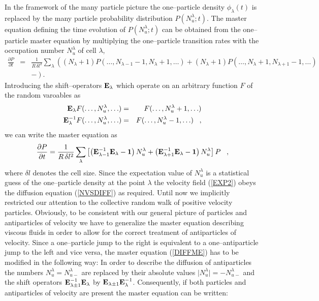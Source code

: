 In the framework of the many particle picture the one--particle
density
$\phi_{\lambda}(t)$ is replaced by the many particle probability
distribution $P(N_u^{\lambda};t)$. The master equation defining the
time evolution of $P(N_u^{\lambda};t)$ can be obtained from the
one--particle master equation by multiplying the one--particle
transition rates
with the occupation number $N_u^{\lambda}$ of cell $\lambda$,
\begin{eqnarray*}
\frac{\partial P}{\partial t} & = &    \frac{1}{R \, \delta l^2}
                                    \sum_{\lambda} \left(
          (N_{\lambda} +1) P(\ldots,N_{\lambda-1}-1, N_{\lambda}+1, \ldots) 
        + (N_{\lambda} +1) P(\ldots, N_{\lambda}+1, N_{\lambda+1} -1, \ldots) 
                                      \right. \\
                            && - \left. \right).
\end{eqnarray*}
Introducing the shift--operators ${\bf E}_{\lambda}$ which operate on an
arbitrary function $F$ of the random varoables as 
\begin{eqnarray}
\label{SHIFT}
{\bf{E}}_{\lambda} F(\ldots, N_u^{\lambda}, \ldots)  & = &
 F(\ldots, N_u^{\lambda} + 1, \ldots)                   \nonumber \\
{\bf{E}}_{\lambda}^{-1} F(\ldots, N_u^{\lambda}, \ldots) & = &
 F(\ldots, N_u^{\lambda} - 1, \ldots)  \;\;\; ,
\end{eqnarray}
we can write the master equation as
\begin{equation}
\label{DIFFME}
\frac{\partial P}{\partial t} =    \frac{1}{R \, \delta l^2}
\sum_{\lambda} \left[ \left( {\bf{E}}_{\lambda -1}^{-1}
     {\bf{E}}_{\lambda}
     - {\bf{1}} \right) N_u^{\lambda}
     + \left( {\bf{E}}_{\lambda +1}^{-1} {\bf{E}}_{\lambda}
     - {\bf{1}} \right) N_u^{\lambda} \right] P  \;\;\; ,
\end{equation}
where $\delta l$ denotes the cell size.
Since the expectation value of $N_u^{\lambda}$ is a statistical
guess of the
one--particle density at the point $\lambda$
the velocity field (\ref{EXP2})
obeys the diffusion equation (\ref{NVSDIFF}) as required.
Until now we implicitly restricted our attention to the collective
random walk of positive velocity particles. Obviously, to be
consistent
with our general picture of particles and antiparticles of velocity
we have to generalize the master equation describing viscous fluids
in order
to allow for the correct treatment of antiparticles of velocity.
Since a one--particle jump to the right is equivalent to a
one--antiparticle
jump to the left and vice versa, the master equation (\ref{DIFFME})
has to
be modified in the following way: In order to describe the
diffusion of
antiparticles the numbers $N_u^{\lambda} = N_{u-}^{\lambda}$
are replaced
by their absolute values $\mid N_u^{\lambda} \mid =
- N_{u-}^{\lambda}$
and the shift operators 
${\bf{E}}_{\lambda \pm 1}^{-1} {\bf{E}}_{\lambda}$ by
${\bf{E}}_{\lambda \pm 1} {\bf{E}}_{\lambda}^{-1}$.
Consequently, if both particles and antiparticles of velocity
are present
the master equation can be written:

